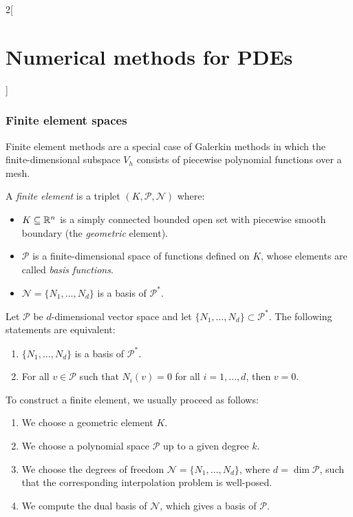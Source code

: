 \documentclass[../../../main_math.tex]{subfiles}
\begin{document}
\begin{multicols}{2}[\section{Numerical methods for PDEs}]
  \subsubsection{Finite element spaces}
  \begin{remark}
    Finite element methods are a special case of Galerkin methods in which the finite-dimensional subspace $V_h$ consists of piecewise polynomial functions over a mesh.
  \end{remark}
  \begin{definition}
    A \emph{finite element} is a triplet $(K,\mathcal{P},\mathcal{N})$ where:
    \begin{itemize}
      \item $K\subseteq\mathbb{R}^n$ is a simply connected bounded open set with piecewise smooth boundary (the \textit{geometric} element).
      \item $\mathcal{P}$ is a finite-dimensional space of functions defined on $K$, whose elements are called \emph{basis functions}.
      \item $\mathcal{N}=\{N_1,\dots,N_d\}$ is a basis of $\mathcal{P}^*$.
    \end{itemize}
  \end{definition}
  \begin{lemma}
    Let $\mathcal{P}$ be $d$-dimensional vector space and let $\{N_1,\dots,N_d\}\subset \mathcal{P}^*$. The following statements are equivalent:
    \begin{enumerate}
      \item $\{N_1,\dots,N_d\}$ is a basis of $\mathcal{P}^*$.
      \item For all $v\in \mathcal{P}$ such that $N_i(v)=0$ for all $i=1,\dots,d$, then $v=0$.
    \end{enumerate}
  \end{lemma}
  \begin{remark}
    To construct a finite element, we usually proceed as follows:
    \begin{enumerate}
      \item We choose a geometric element $K$.
      \item We choose a polynomial space $\mathcal{P}$ up to a given degree $k$.
      \item We choose the degrees of freedom $\mathcal{N}=\{N_1,\dots,N_d\}$, where $d=\dim \mathcal{P}$, such that the corresponding interpolation problem is well-posed.
      \item We compute the dual basis of $\mathcal{N}$, which gives a basis of $\mathcal{P}$.

\end{enumerate}
\end{remark}
\end{multicols}
\end{document}
